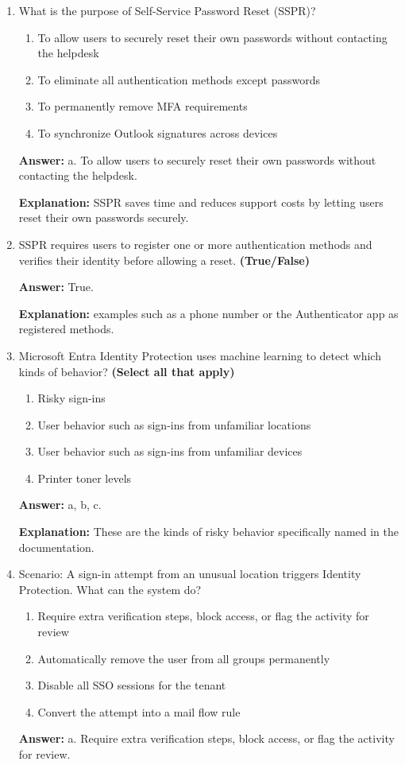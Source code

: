 \documentclass[10pt]{article}
\begin{document}
\begin{enumerate}[leftmargin=*]
\textbf{Explanation:} this example to illustrate MFA for sensitive access from a new device.

\item What is the purpose of Self-Service Password Reset (SSPR)?
\begin{enumerate}[label=\alph*., leftmargin=1.5em]
\item To allow users to securely reset their own passwords without contacting the helpdesk
\item To eliminate all authentication methods except passwords
\item To permanently remove MFA requirements
\item To synchronize Outlook signatures across devices
\end{enumerate}
\textbf{Answer:} a. To allow users to securely reset their own passwords without contacting the helpdesk.

\textbf{Explanation:} SSPR saves time and reduces support costs by letting users reset their own passwords securely.

\item SSPR requires users to register one or more authentication methods and verifies their identity before allowing a reset. \textbf{(True/False)}

\textbf{Answer:} True.

\textbf{Explanation:} examples such as a phone number or the Authenticator app as registered methods.

\item Microsoft Entra Identity Protection uses machine learning to detect which kinds of behavior? \textbf{(Select all that apply)}
\begin{enumerate}[label=\alph*., leftmargin=1.5em]
\item Risky sign-ins
\item User behavior such as sign-ins from unfamiliar locations
\item User behavior such as sign-ins from unfamiliar devices
\item Printer toner levels
\end{enumerate}
\textbf{Answer:} a, b, c.

\textbf{Explanation:} These are the kinds of risky behavior specifically named in the documentation.

\item Scenario: A sign-in attempt from an unusual location triggers Identity Protection. What can the system do?
\begin{enumerate}[label=\alph*., leftmargin=1.5em]
\item Require extra verification steps, block access, or flag the activity for review
\item Automatically remove the user from all groups permanently
\item Disable all SSO sessions for the tenant
\item Convert the attempt into a mail flow rule
\end{enumerate}
\textbf{Answer:} a. Require extra verification steps, block access, or flag the activity for review.


\end{enumerate}
\end{document}
